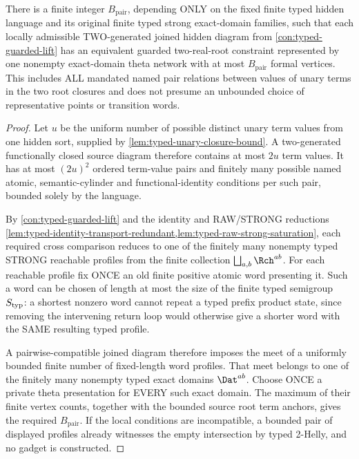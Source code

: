 \begin{lemma}
\label{lem:typed-two-root-uniform-size}
There is a finite integer
\(B_{\mathrm{pair}}\), depending
ONLY on the fixed finite typed
hidden language and its original
finite typed strong exact-domain
families, such that each locally
admissible TWO-generated joined
hidden diagram from
\cref{con:typed-guarded-lift}
has an equivalent guarded
two-real-root constraint
represented by one nonempty
exact-domain theta network
with at most \(B_{\mathrm{pair}}\)
formal vertices.
This includes ALL mandated
named pair relations between
values of unary terms in the
two root closures and
does not presume an unbounded
choice of representative
points or transition words.
\end{lemma}
\begin{proof}
Let \(u\) be the uniform number
of possible distinct unary
term values from one hidden
sort, supplied by
\cref{lem:typed-unary-closure-bound}.
A two-generated functionally
closed source diagram therefore
contains at most \(2u\)
term values. It has at most
\((2u)^2\) ordered term-value
pairs and finitely many
possible named atomic,
semantic-cylinder and
functional-identity conditions
per such pair, bounded solely
by the language.

By
\cref{con:typed-guarded-lift}
and the identity and
RAW/STRONG reductions
\cref{lem:typed-identity-transport-redundant,lem:typed-raw-strong-saturation},
each required cross comparison
reduces to one of the finitely
many nonempty typed STRONG
reachable profiles from the
finite collection
\(\bigsqcup_{a,b}\Rch^{ab}\).
For each reachable profile
fix ONCE an old finite
positive atomic word
presenting it. Such a word
can be chosen of length
at most the size of the
finite typed semigroup
\(S_{\rm typ}\): a shortest
nonzero word cannot
repeat a typed prefix
product state, since
removing the intervening
return loop would otherwise
give a shorter word with
the SAME resulting typed
profile.

A pairwise-compatible
joined diagram therefore
imposes the meet of a
uniformly bounded finite
number of fixed-length
word profiles. That meet
belongs to one of the
finitely many nonempty
typed exact domains
\(\Dat^{ab}\). Choose ONCE
a private theta
presentation for EVERY
such exact domain. The
maximum of their finite
vertex counts, together
with the bounded source
root term anchors, gives
the required
\(B_{\mathrm{pair}}\).
If the local conditions
are incompatible, a
bounded pair of displayed
profiles already witnesses
the empty intersection
by typed 2-Helly, and no
gadget is constructed.
\end{proof}

